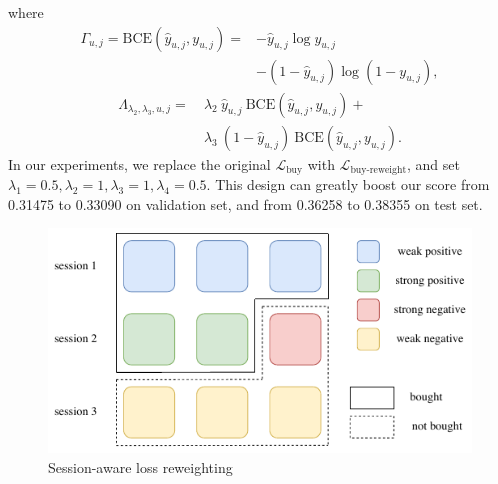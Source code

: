 \normalsize
where
\begin{equation}
\begin{aligned}
    \Gamma_{u,j} = \text{BCE}(\hat{y}_{u,j}, y_{u,j}) = &- \hat{y}_{u,j} \log y_{u,j} \\
    &- (1-\hat{y}_{u,j}) \log (1-y_{u,j}),
\end{aligned}
\end{equation}
\begin{equation}
\begin{aligned}
    \Lambda_{\lambda_2,\lambda_3,u,j} =& ~\lambda_2~\hat{y}_{u,j}~\text{BCE}(\hat{y}_{u,j}, y_{u,j}) + \\
    & ~\lambda_3~(1-\hat{y}_{u,j})~\text{BCE}(\hat{y}_{u,j}, y_{u,j}).
\end{aligned}
\end{equation}
In our experiments, we replace the original $\mathcal{L}_{\text{buy}}$ with $\mathcal{L}_{\text{buy-reweight}}$, and set $\lambda_1 = 0.5, \lambda_2 = 1, \lambda_3 = 1, \lambda_4 = 0.5$.
This design can greatly boost our score from 0.31475 to 0.33090 on validation set, and from 0.36258 to 0.38355 on test set.

\begin{figure}[htbp]
    \centering
    \includegraphics[width=\linewidth]{figures/reweightloss.pdf}
    \caption{Session-aware loss reweighting}
    \label{fig:reweightloss}
\end{figure}



